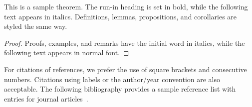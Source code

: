 \documentclass[runningheads]{llncs}
\begin{document}
\begin{theorem}
    This is a sample theorem. The run-in heading is set in bold, while
    the following text appears in italics. Definitions, lemmas,
    propositions, and corollaries are styled the same way.
\end{theorem}
%
%
\begin{proof}
    Proofs, examples, and remarks have the initial word in italics,
    while the following text appears in normal font.
\end{proof}
For citations of references, we prefer the use of square brackets
and consecutive numbers. Citations using labels or the author/year
convention are also acceptable. The following bibliography provides
a sample reference list with entries for journal
articles~\cite{Dardha2017}.



\end{document}
